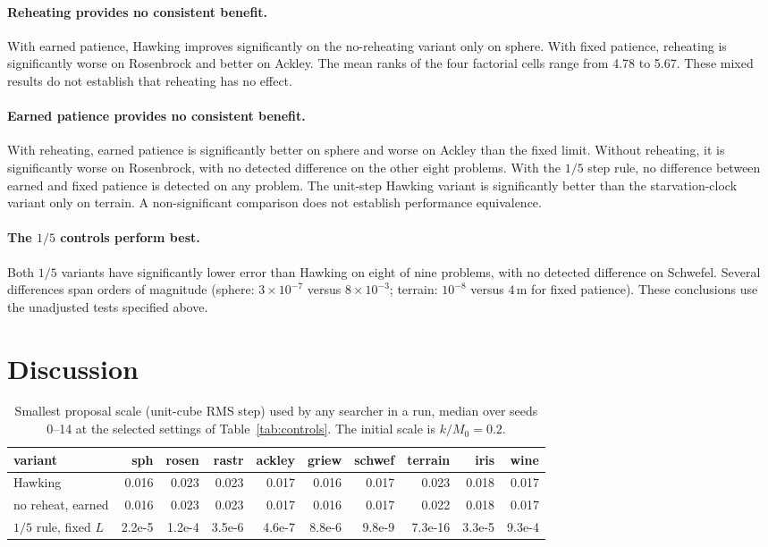 \documentclass[10pt,a4paper]{article}
\begin{document}
\paragraph{Reheating provides no consistent benefit.} With earned patience,
Hawking improves significantly on the no-reheating variant only on sphere.
With fixed patience, reheating is significantly worse on Rosenbrock and better
on Ackley. The mean ranks of the four factorial cells range from 4.78 to 5.67.
These mixed results do not establish that reheating has no effect.

\paragraph{Earned patience provides no consistent benefit.} With reheating,
earned patience is significantly better on sphere and worse on Ackley than the
fixed limit. Without reheating, it is significantly worse on Rosenbrock, with
no detected difference on the other eight problems. With the $1/5$ step rule,
no difference between earned and fixed patience is detected on any problem.
The unit-step Hawking variant is significantly better than the starvation-clock
variant only on terrain. A non-significant comparison does not establish
performance equivalence.

\paragraph{The $1/5$ controls perform best.} Both $1/5$ variants have significantly
lower error than Hawking on eight of nine problems, with no detected difference
on Schwefel. Several differences span orders of magnitude (sphere:
$3\times10^{-7}$ versus $8\times10^{-3}$; terrain: $10^{-8}$ versus $4$\,m for
fixed patience). These conclusions use the unadjusted tests specified above.

\section{Discussion}
\label{sec:discussion}

\begin{table}[t]
\centering
\footnotesize
\setlength{\tabcolsep}{3.4pt}
\caption{Smallest proposal scale (unit-cube RMS step) used by any searcher in a
run, median over seeds 0--14 at the selected settings of
Table~\ref{tab:controls}. The initial scale is $k/M_0=0.2$.}
\label{tab:floor}
\begin{tabular}{@{}lrrrrrrrrr@{}}
\toprule
variant & sph & rosen & rastr & ackley & griew & schwef & terrain & iris & wine \\
\midrule
Hawking               & 0.016 & 0.023 & 0.023 & 0.017 & 0.016 & 0.017 & 0.023 & 0.018 & 0.017 \\
no reheat, earned     & 0.016 & 0.023 & 0.023 & 0.017 & 0.016 & 0.017 & 0.022 & 0.018 & 0.017 \\
$1/5$ rule, fixed $L$ & 2.2e-5 & 1.2e-4 & 3.5e-6 & 4.6e-7 & 8.8e-6 & 9.8e-9 & 7.3e-16 & 3.3e-5 & 9.3e-4 \\
\bottomrule
\end{tabular}
\end{table}
\end{document}
